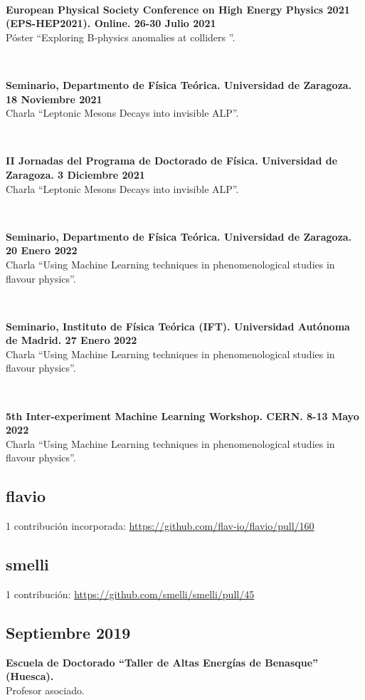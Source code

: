 \documentclass[combined.tex]{subfiles}
\begin{document}
~

\textbf{European Physical Society Conference on High Energy Physics 2021 (EPS-HEP2021). Online. 26-30 Julio 2021}\\
Póster ``Exploring B-physics anomalies at colliders ''.

~

\textbf{Seminario, Departmento de Física Teórica. Universidad de Zaragoza. 18 Noviembre 2021}\\
Charla ``Leptonic Mesons Decays into invisible ALP''.

~

\textbf{II Jornadas del Programa de Doctorado de Física. Universidad de Zaragoza. 3 Diciembre 2021}\\
Charla ``Leptonic Mesons Decays into invisible ALP''.

~

\textbf{Seminario, Departmento de Física Teórica. Universidad de Zaragoza. 20 Enero 2022}\\
Charla ``Using Machine Learning techniques in phenomenological studies in flavour physics''.

~

\textbf{Seminario, Instituto de Física Teórica (IFT). Universidad Autónoma de Madrid. 27 Enero 2022}\\
Charla ``Using Machine Learning techniques in phenomenological studies in flavour physics''.

~

\textbf{5th Inter-experiment Machine Learning Workshop. CERN. 8-13 Mayo 2022}\\
Charla ``Using Machine Learning techniques in phenomenological studies in flavour physics''.


\subsection{flavio}
1 contribución incorporada: \url{https://github.com/flav-io/flavio/pull/160}

\subsection{smelli}
1 contribución: \url{https://github.com/smelli/smelli/pull/45}


\subsection{Septiembre 2019}
\hspace{\parindent}\textbf{Escuela de Doctorado ``Taller de Altas Energías de Benasque'' (Huesca).}\\
Profesor asociado.
\end{document}
